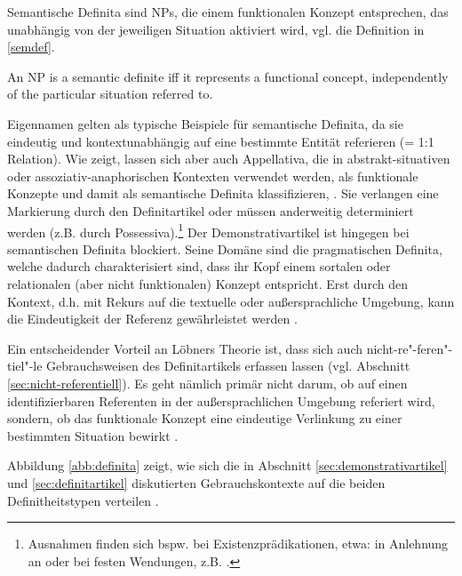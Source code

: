 Semantische Definita sind NPs, die einem funktionalen Konzept entsprechen, das unabhängig von der jeweiligen Situation aktiviert wird, vgl. die Definition in \ref{semdef}. 

\begin{exe}
	\ex \label{semdef}  An NP is a semantic definite iff it represents a functional concept, independently of the particular situation referred to. \parencite[299]{Lobner1985}
\end{exe}

Eigennamen gelten als typische Beispiele für semantische Definita, da sie eindeutig und kontextunabhängig auf eine bestimmte Entität referieren (= 1:1 Relation). Wie \textcite[299--307]{Lobner1985} zeigt, lassen sich aber auch Appellativa, die in abstrakt-situativen oder assoziativ-anaphorischen Kontexten verwendet werden, als funktionale Konzepte und damit als semantische Definita klassifizieren, \parencite[s. hierzu auch ausführlich][104--110]{Demske2001}. Sie verlangen eine Markierung durch den Definitartikel oder müssen anderweitig determiniert werden (z.B. durch Possessiva).\footnote{Ausnahmen finden sich bspw. bei Existenzprädikationen, etwa:  in Anlehnung an \textcite[297]{Lobner1985} oder bei festen Wendungen, z.B.  \parencite[311]{Lobner1985}.}
Der Demonstrativartikel ist hingegen bei semantischen Definita blockiert. Seine Domäne sind die pragmatischen Definita, welche dadurch charakterisiert sind, dass ihr Kopf einem sortalen oder relationalen (aber nicht funktionalen) Konzept entspricht. Erst durch den Kontext, d.h. mit Rekurs auf die textuelle oder außersprachliche Umgebung, kann die Eindeutigkeit der Referenz gewährleistet werden \parencite[307]{Lobner1985}. 

Ein entscheidender Vorteil an Löbners Theorie ist, dass sich auch nicht-re"-feren"-tiel"-le Gebrauchsweisen des Definitartikels erfassen lassen (vgl. Abschnitt \ref{sec:nicht-referentiell}). Es geht nämlich primär nicht darum, ob auf einen  identifizierbaren Referenten in der außersprachlichen Umgebung referiert wird, sondern, ob das funktionale Konzept eine eindeutige Verlinkung zu einer bestimmten Situation bewirkt \parencite[304ff.]{Lobner1985}. 


Abbildung \ref{abb:definita} zeigt, wie sich die in Abschnitt \ref{sec:demonstrativartikel} und \ref{sec:definitartikel} diskutierten Gebrauchskontexte auf die beiden Definitheitstypen verteilen \parencite[angelehnt an und erweitert nach][71ff.]{Szczepaniak2011a}. 

